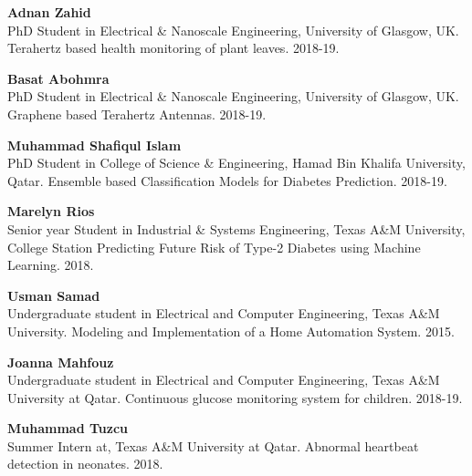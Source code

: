 \documentclass[10pt]{article}
\begin{document}
\begin{bibsection}
    \item \textbf{Adnan Zahid}\\
        PhD Student in Electrical \& Nanoscale Engineering, University of Glasgow, UK.
        Terahertz based health monitoring of plant leaves.
        2018-19.

    \item \textbf{Basat Abohmra}\\
        PhD Student in Electrical \& Nanoscale Engineering, University of Glasgow, UK.
        Graphene based Terahertz Antennas.
        2018-19.
        
    \item \textbf{Muhammad Shafiqul Islam}\\
        PhD Student in College of Science \& Engineering, Hamad Bin Khalifa University, Qatar.
        Ensemble based Classification Models for Diabetes Prediction.
        2018-19.
        
    \item \textbf{Marelyn Rios}\\
        Senior year Student in Industrial \& Systems Engineering, Texas A\&M University, College Station
        Predicting Future Risk of Type-2 Diabetes using Machine Learning.
        2018.

    \item \textbf{Usman Samad}\\
        Undergraduate student in Electrical and Computer Engineering, Texas A\&M University.
        Modeling and Implementation of a Home Automation System.
        2015.
    
    \item \textbf{Joanna Mahfouz}\\
        Undergraduate student in Electrical and Computer Engineering, Texas A\&M University at Qatar.
        Continuous glucose monitoring system for children.
        2018-19.
        
    \item \textbf{Muhammad Tuzcu}\\
        Summer Intern at, Texas A\&M University at Qatar.
        Abnormal heartbeat detection in neonates.
        2018.

\end{bibsection}




\end{document}

